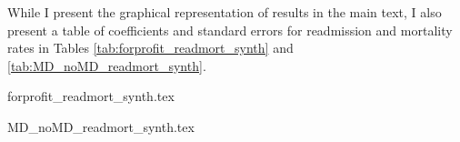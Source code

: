 \documentclass[12pt]{article}
\begin{document}
While I present the graphical representation of results in the main text, I also present a table of coefficients and standard errors for readmission and mortality rates in Tables \ref{tab:forprofit_readmort_synth} and \ref{tab:MD_noMD_readmort_synth}.

{forprofit_readmort_synth.tex}

{MD_noMD_readmort_synth.tex}


    

    

    

    

    

    

	
	
	
\end{document}
